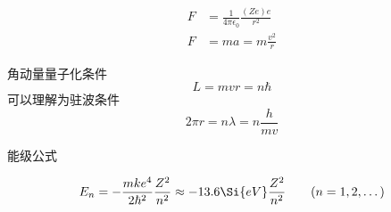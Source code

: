 \begin{equation}
\begin{aligned}
F &= \frac{1}{4\pi \epsilon_0} \frac{(Ze)e}{r^2}
\\
F &= ma = m\frac{v^2}{r}
\end{aligned}
\end{equation}

角动量量子化条件
\begin{equation}
L = mvr = n\hbar
\end{equation}
可以理解为驻波条件
\begin{equation}
2\pi r = n \lambda = n \frac{h}{mv}
\end{equation}

能级公式

\begin{equation}
E_n =  - \frac{m k e^4}{2 \hbar ^2} \frac{Z^2}{n^2} \approx - 13.6\Si{eV} \frac{Z^2}{n^2}
\qquad (n = 1, 2, \dots)
\end{equation}

